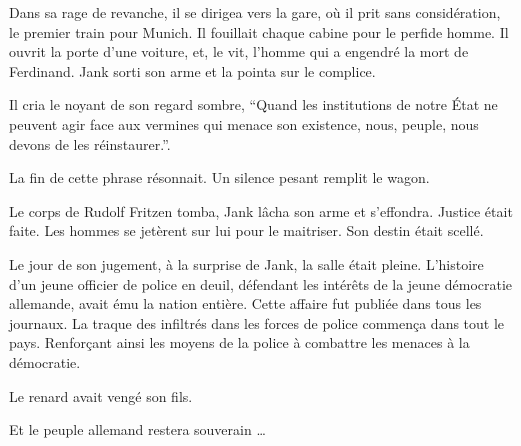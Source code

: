 Dans sa rage de revanche, il se dirigea vers la gare, où il prit sans considération, le premier train pour Munich.
Il fouillait chaque cabine pour le perfide homme.
Il ouvrit la porte d'une voiture, et, le vit, l'homme qui a engendré la mort de Ferdinand.
Jank sorti son arme et la pointa sur le complice.

Il cria le noyant de son regard sombre, \enquote{Quand les institutions de notre État ne peuvent agir face aux vermines qui menace son existence, nous, peuple, nous devons de les réinstaurer.}.

La fin de cette phrase résonnait.
Un silence pesant remplit le wagon.

Le corps de Rudolf Fritzen tomba, Jank lâcha son arme et s'effondra.
Justice était faite.
Les hommes se jetèrent sur lui pour le maitriser.
Son destin était scellé.

Le jour de son jugement, à la surprise de Jank, la salle était pleine.
L'histoire d'un jeune officier de police en deuil, défendant les intérêts de la jeune démocratie allemande, avait ému la nation entière. 
Cette affaire fut publiée dans tous les journaux.
La traque des infiltrés dans les forces de police commença dans tout le pays.
Renforçant ainsi les moyens de la police à combattre les menaces à la démocratie. 

Le renard avait vengé son fils.

Et le peuple allemand restera souverain \dots
